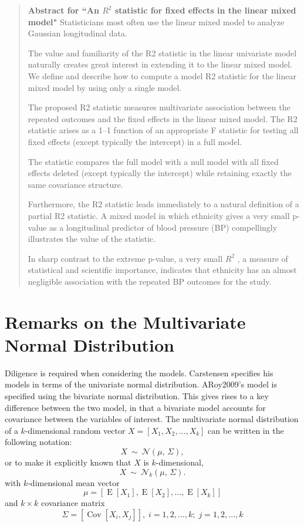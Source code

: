 \documentclass[12pt, a4paper]{report}
\theoremstyle{plain}
\theoremstyle{definition}
\theoremstyle{remark}
\begin{document}
	\begin{framed}
		
		\begin{quote}
			\textbf{Abstract for ``An $R^2$ statistic for fixed effects in the linear mixed model"}
			Statisticians most often use the linear mixed model to analyze Gaussian longitudinal data. 
			
			The value and familiarity of the R2 statistic in the linear univariate model naturally creates great interest in extending it to the linear mixed model. We define and describe how to compute a model R2 statistic for the linear mixed model by using only a single model. 
			
			The proposed R2 statistic measures multivariate association between the repeated outcomes and the fixed effects in the linear mixed model. The R2 statistic arises as a 1–1 function of an appropriate F statistic for testing all fixed effects (except typically the intercept) in a full model. 
			
			The statistic compares the full model with a null model with all fixed effects deleted (except typically the intercept) while retaining exactly the same covariance structure. 
			
			Furthermore, the R2 statistic leads immediately to a natural definition of a partial R2 statistic. A mixed model in which ethnicity gives a very small p-value as a longitudinal predictor of blood pressure (BP) compellingly illustrates the value of the statistic. 
			
			In sharp contrast to the extreme p-value, a very small $R^2$ , a measure of statistical and scientific importance, indicates that ethnicity has an almost negligible association with the repeated BP outcomes for the study.
		\end{quote}
	\end{framed}
	
	\section{Remarks on the Multivariate Normal Distribution}
	
	Diligence is required when considering the models. Carstensen specifies his models in terms of the univariate normal distribution. ARoy2009's model is specified using the bivariate normal distribution.
	This gives rises to a key difference between the two model, in that a bivariate model accounts for covariance between the variables of interest.
	The multivariate normal distribution of a $k$-dimensional random vector $X = [X_1, X_2, \ldots, X_k]$
	can be written in the following notation:
	\[
	X\ \sim\ \mathcal{N}(\mu,\, \Sigma),
	\]
	or to make it explicitly known that $X$ is $k$-dimensional,
	\[
	X\ \sim\ \mathcal{N}_k(\mu,\, \Sigma).
	\]
	with $k$-dimensional mean vector
	\[ \mu = [ \operatorname{E}[X_1], \operatorname{E}[X_2], \ldots, \operatorname{E}[X_k]] \]
	and $k \times k$ covariance matrix
	\[ \Sigma = [\operatorname{Cov}[X_i, X_j]], \; i=1,2,\ldots,k; \; j=1,2,\ldots,k \]
	
\end{document}
